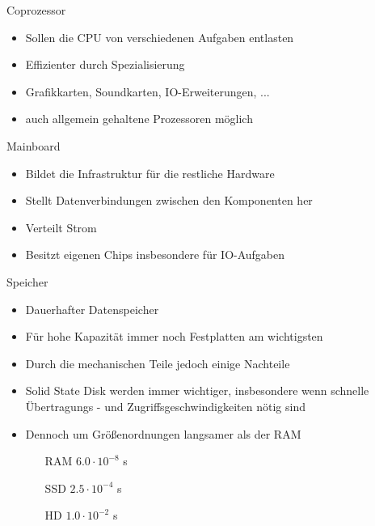 \documentclass[aspectratio=43]{beamer}
\begin{document}
\begin{frame} 

	\begin{block}{Coprozessor} 
	\begin{itemize}
	\item Sollen die CPU von verschiedenen Aufgaben entlasten
	\item Effizienter durch Spezialisierung 
	\item Grafikkarten, Soundkarten, IO-Erweiterungen, ...
	\item auch allgemein gehaltene Prozessoren möglich
	\end{itemize}
	\end{block}

	\begin{block}{Mainboard} 
	\begin{itemize}
	\item Bildet die Infrastruktur für die restliche Hardware
	\item Stellt Datenverbindungen zwischen den Komponenten her
	\item Verteilt Strom
	\item Besitzt eigenen Chips insbesondere für IO-Aufgaben
	\end{itemize}
	\end{block}
\end{frame}

\begin{frame} 

	\begin{block}{Speicher} 
	\begin{itemize}
	\item Dauerhafter Datenspeicher
	\item Für hohe Kapazität immer noch Festplatten am wichtigsten
	\item Durch die mechanischen Teile jedoch einige Nachteile
	\item Solid State Disk werden immer wichtiger, insbesondere wenn schnelle Übertragungs - und Zugriffsgeschwindigkeiten nötig sind
	\item Dennoch um Größenordnungen langsamer als der RAM 
	\begin{itemize}
	 \item[RAM] $6.0\cdot10^{-8}$ s
	\item[SSD] $2.5 \cdot10^{-4}$ s
	\item[HD] $1.0\cdot10^{-2}$ s
	\end{itemize}
	\end{itemize}
	\end{block}

\end{frame}
\end{document}
